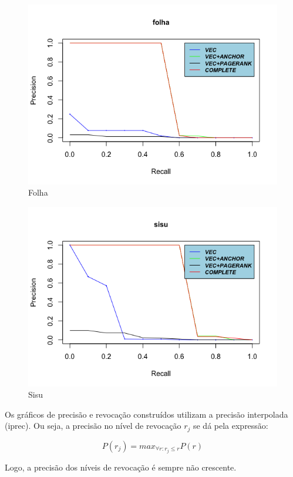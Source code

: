 \documentclass{article}
\begin{document}
\begin{figure}
\centering
\includegraphics[width=\linewidth]{query_folha.png}
\caption{Folha} 
\label{fig:folha}
\end{figure}

\begin{figure}
\centering
\includegraphics[width=\linewidth]{query_sisu.png}
\caption{Sisu} 
\label{fig:sisu}
\end{figure}

Os gráficos de precisão e revocação construídos utilizam a precisão interpolada (iprec). Ou seja, a precisão no nível de
revocação $ r_j $ se dá pela expressão:

\[
P(r_j) = max_{\forall r : r_j \leq r} P(r)
\]

Logo, a precisão dos níveis de revocação é sempre não crescente.
\end{document}
